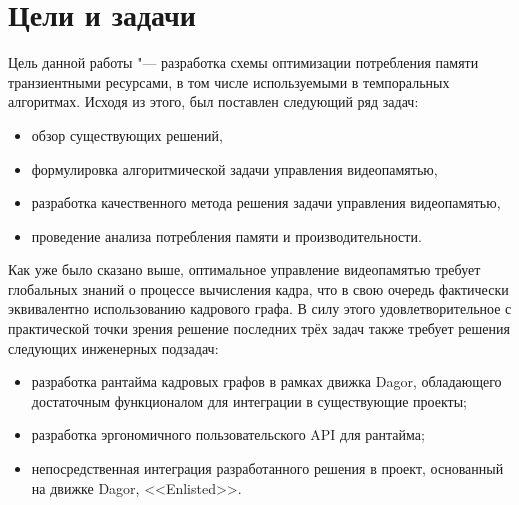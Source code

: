 \section{Цели и задачи}
Цель данной работы "--- разработка схемы оптимизации потребления памяти транзиентными ресурсами, в том числе используемыми в темпоральных алгоритмах. Исходя из этого, был поставлен следующий ряд задач:
\begin{itemize}
    \item обзор существующих решений,
    \item формулировка алгоритмической задачи управления видеопамятью,
    \item разработка качественного метода решения задачи управления видеопамятью,
    \item проведение анализа потребления памяти и производительности.
\end{itemize}
Как уже было сказано выше, оптимальное управление видеопамятью требует глобальных знаний о процессе вычисления кадра, что в свою очередь фактически эквивалентно использованию кадрового графа.
В силу этого удовлетворительное с практической точки зрения решение последних трёх задач также требует решения следующих инженерных подзадач:
\begin{itemize}
    \item разработка рантайма кадровых графов в рамках движка Dagor, обладающего достаточным функционалом для интеграции в существующие проекты;
    \item разработка эргономичного пользовательского API для рантайма;
    \item непосредственная интеграция разработанного решения в проект, основанный на движке Dagor, <<Enlisted>>.
\end{itemize}
